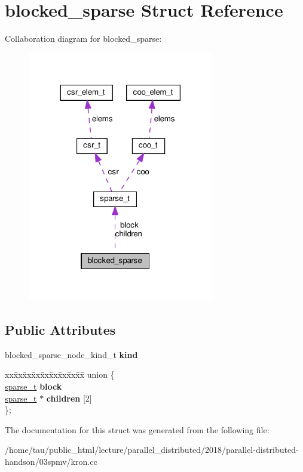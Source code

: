 \hypertarget{structblocked__sparse}{}\section{blocked\+\_\+sparse Struct Reference}
\label{structblocked__sparse}


Collaboration diagram for blocked\+\_\+sparse\+:
\nopagebreak
\begin{figure}[H]
\begin{center}
\leavevmode
\includegraphics[width=230pt]{structblocked__sparse__coll__graph}
\end{center}
\end{figure}
\subsection*{Public Attributes}
\begin{DoxyCompactItemize}
\item 
\mbox{\label{structblocked__sparse_a3822488f0e6655790a62918699ffd447}} 
blocked\+\_\+sparse\+\_\+node\+\_\+kind\+\_\+t {\bfseries kind}
\item 
\mbox{\label{structblocked__sparse_acc99a2fc2f927ebf5c657ad069d53650}} 
\begin{tabbing}
xx\=xx\=xx\=xx\=xx\=xx\=xx\=xx\=xx\=\kill
union \{\\
\>\hyperlink{structsparse__t}{sparse\_t} {\bfseries block}\\
\>\hyperlink{structsparse__t}{sparse\_t} $\ast$ {\bfseries children} \mbox{[}2\mbox{]}\\
\}; \\

\end{tabbing}\end{DoxyCompactItemize}


The documentation for this struct was generated from the following file\+:\begin{DoxyCompactItemize}
\item 
/home/tau/public\+\_\+html/lecture/parallel\+\_\+distributed/2018/parallel-\/distributed-\/handson/03spmv/kron.\+cc\end{DoxyCompactItemize}
